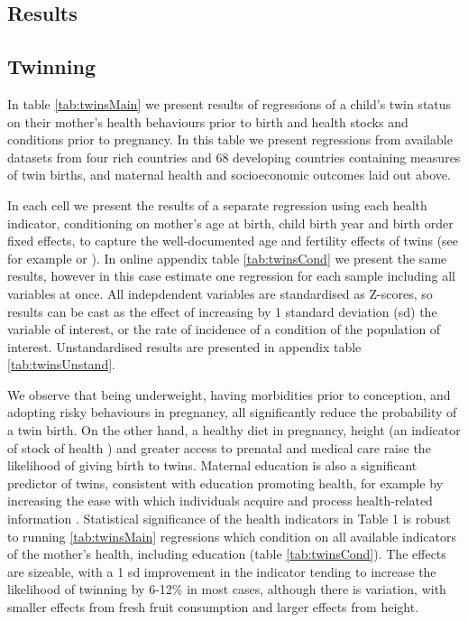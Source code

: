 \documentclass[subeqn]{article}
\begin{document}
\begin{spacing}{1.4}
\section{Results}                                  \label{TWINscn:results}
\subsection{Twinning}                              \label{TWINsscn:twinning}
In table \ref{tab:twinsMain} we present results of regressions of a child's
twin status on their mother's health behaviours prior to birth and health
stocks and conditions prior to pregnancy.  In this table we present regressions
from available datasets from four rich countries and 68 developing countries
containing measures of twin births, and maternal health and socioeconomic
outcomes laid out above.

In each cell we present the results of a separate regression using each health
indicator, conditioning on mother's age at birth, child birth year and birth
order fixed effects, to capture the well-documented age and fertility effects
of twins (see for example \citet{Hall2003} or \citet{RosenzweigWolpin1980}). In
online appendix table \ref{tab:twinsCond} we present the same results, however
in this case estimate one regression for each sample including all variables at
once. All indepdendent variables are standardised as Z-scores, so results can
be cast as the effect of increasing by 1 standard deviation (sd) the variable of
interest, or the rate of incidence of a condition of the population of interest.
Unstandardised results are presented in appendix table \ref{tab:twinsUnstand}.

We observe that being underweight, having morbidities prior to conception, and
adopting risky behaviours in pregnancy, all significantly reduce the probability
of a twin birth. On the other hand, a healthy diet in pregnancy, height (an
indicator of stock of health \citet{Silventoinen2003,BhalotraRawlings2013}) and
greater access to prenatal and medical care raise the likelihood of giving birth
to twins. Maternal education is also a significant predictor of twins, consistent
with education promoting health, for example by increasing the ease with which
individuals acquire and process health-related information \citep{Kenkel1991,
  CutlerLlerasMuney2010}. Statistical significance of the health indicators in
Table 1 is robust to running \ref{tab:twinsMain} regressions which condition on
all available indicators of the mother's health, including education (table
\ref{tab:twinsCond}). The effects are sizeable, with a 1 sd improvement in the
indicator tending to increase the likelihood of twinning by 6-12\% in most cases,
although there is variation, with smaller effects from fresh fruit consumption
and larger effects from height.


\end{spacing}
\end{document}
